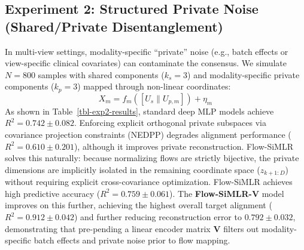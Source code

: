 \documentclass[
  letterpaper,
]{report}
\begin{document}
\subsection{Experiment 2: Structured Private Noise (Shared/Private
Disentanglement)}\label{experiment-2-structured-private-noise-sharedprivate-disentanglement}

In multi-view settings, modality-specific ``private'' noise (e.g., batch
effects or view-specific clinical covariates) can contaminate the
consensus. We simulate \(N=800\) samples with shared components
(\(k_s=3\)) and modality-specific private components (\(k_p=3\)) mapped
through non-linear coordinates:
\[X_m = f_m([U_s \parallel U_{p,m}]) + \eta_m\] As shown in
Table~\ref{tbl-exp2-results}, standard deep MLP models achieve
\(R^2 = 0.742 \pm 0.082\). Enforcing explicit orthogonal private
subspaces via covariance projection constraints (NEDPP) degrades
alignment performance (\(R^2 = 0.610 \pm 0.201\)), although it improves
private reconstruction. Flow-SiMLR solves this naturally: because
normalizing flows are strictly bijective, the private dimensions are
implicitly isolated in the remaining coordinate space (\(z_{k+1:D}\))
without requiring explicit cross-covariance optimization. Flow-SiMLR
achieves high predictive accuracy (\(R^2 = 0.759 \pm 0.061\)). The
\textbf{Flow-SiMLR-V} model improves on this further, achieving the
highest overall target alignment (\(R^2 = 0.912 \pm 0.042\)) and further
reducing reconstruction error to \(0.792 \pm 0.032\), demonstrating that
pre-pending a linear encoder matrix \(\mathbf{V}\) filters out
modality-specific batch effects and private noise prior to flow mapping.
\end{document}
